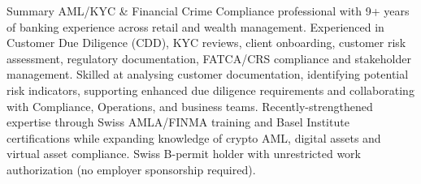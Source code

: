 \begin{rubric}{Summary}
\entry*[]
    AML/KYC \& Financial Crime Compliance professional with 9+ years of banking experience across retail and wealth management. 
\entry*[]
    Experienced in Customer Due Diligence (CDD), KYC reviews, client onboarding, customer risk assessment, regulatory documentation, FATCA/CRS compliance and stakeholder management. 
\entry*[]
    Skilled at analysing customer documentation, identifying potential risk
indicators, supporting enhanced due diligence requirements and collaborating with Compliance, Operations, and business teams. 
\entry*[]
    Recently-strengthened expertise through Swiss AMLA/FINMA training and Basel Institute certifications while expanding knowledge of crypto AML, digital assets and virtual asset compliance. 
\entry*[]
    Swiss B-permit holder with unrestricted work authorization (no employer sponsorship required).
\end{rubric}